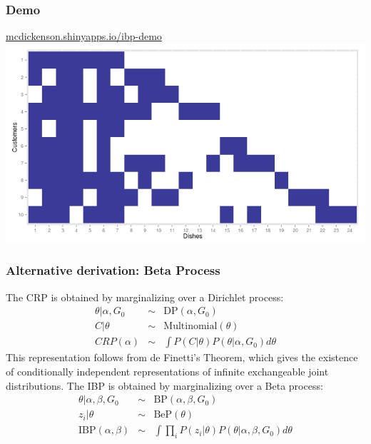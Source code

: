 \documentclass[13pt]{beamer}
\begin{document}
\begin{frame}
\frametitle{Demo}

\begin{center}
\href{http://mcdickenson.shinyapps.io/ibp-demo}{mcdickenson.shinyapps.io/ibp-demo}
\includegraphics[scale=0.4]{./img/ibp-shiny-demo.png}
\end{center}

\end{frame}
\begin{frame}
\frametitle{Alternative derivation: Beta Process}
The CRP is obtained by marginalizing over a Dirichlet process:
\begin{eqnarray*}
    \theta | \alpha, G_0 &\sim& \text{DP}(\alpha,G_0) \\
    C | \theta &\sim& \text{Multinomial}(\theta) \\
    CRP(\alpha) &\sim& \int P(C | \theta) P(\theta | \alpha, G_0) d\theta 
\end{eqnarray*}
This representation follows from de Finetti's Theorem, which gives the existence of conditionally independent representations of infinite exchangeable joint distributions.
The IBP is obtained by marginalizing over a Beta process:
\begin{eqnarray*}
    \theta | \alpha, \beta, G_0 &\sim& \text{BP}(\alpha, \beta, G_0) \\
    z_i | \theta &\sim& \text{BeP}(\theta) \\
    \text{IBP}(\alpha, \beta) &\sim& \int \prod_i P(z_i | \theta) P(\theta | \alpha, \beta, G_0) d\theta 
\end{eqnarray*}
\end{frame}
\end{document}
